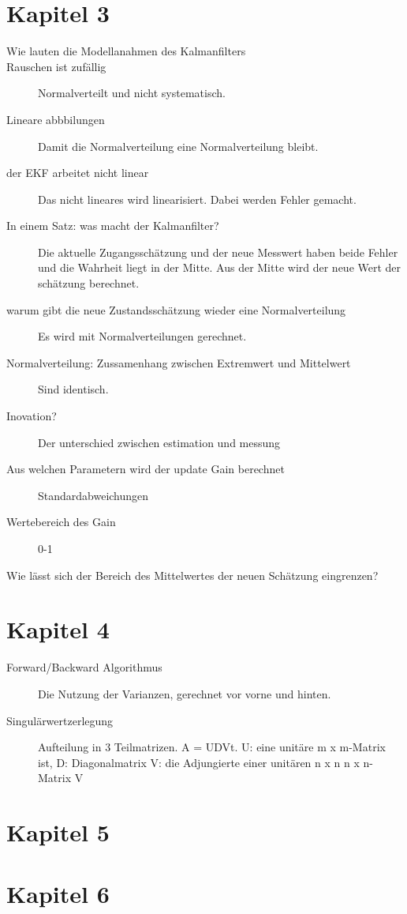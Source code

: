 \section{Kapitel 3}
\label{sec:faq:kap3}
\begin{description}
 	\item[Wie lauten die Modellanahmen des Kalmanfilters]
	\item[Rauschen ist zufällig] Normalverteilt und nicht systematisch.
	\item[Lineare abbbilungen] Damit die Normalverteilung eine Normalverteilung bleibt.
	\item[der EKF arbeitet nicht linear] Das nicht lineares wird linearisiert. Dabei werden Fehler gemacht.
	\item[In einem Satz: was macht der Kalmanfilter?] Die aktuelle Zugangsschätzung und der neue Messwert haben beide Fehler und die Wahrheit liegt in der Mitte. Aus der Mitte wird der neue Wert der schätzung berechnet.
	\item[warum gibt die neue Zustandsschätzung wieder eine Normalverteilung] Es wird mit Normalverteilungen gerechnet.
	\item[Normalverteilung: Zussamenhang zwischen Extremwert und Mittelwert] Sind identisch.
	\item[Inovation?] Der unterschied zwischen estimation und messung
	\item[Aus welchen Parametern wird der update Gain berechnet] Standardabweichungen
	\item[Wertebereich des Gain] 0-1
	\item[Wie lässt sich der Bereich des Mittelwertes der neuen Schätzung eingrenzen?]
	
\end{description}

\section{Kapitel 4}
\label{sec:faq:kap4}
\begin{description}
	\item[Forward/Backward Algorithmus] Die Nutzung der Varianzen, gerechnet vor vorne und hinten.
	\item[Singulärwertzerlegung] Aufteilung in 3 Teilmatrizen. A = UDVt. U: eine unitäre  m x m-Matrix ist, D: Diagonalmatrix V:  die Adjungierte einer unitären n x n  n x n-Matrix V
\end{description}

\section{Kapitel 5}
\label{sec:faq:kap5}

\section{Kapitel 6}
\label{sec:faq:kap6}

\cite{test}